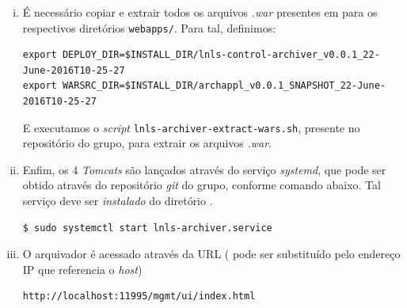 \begin {enumerate}[i.]
\begin{lstlisting}[keywordstyle=\ttfamily, style=nonumbers]
<Context ...>
	<Resource   name="jdbc/archappl"
	      auth="Container"
	      type="javax.sql.DataSource"
	      factory="org.apache.tomcat.jdbc.pool.DataSourceFactory"
	      username="lnls_user"
	      password="controle" 
	      testWhileIdle="true"
	      testOnBorrow="true"
	      testOnReturn="false"
	      validationQuery="SELECT 1"
	      validationInterval="30000"
	      timeBetweenEvictionRunsMillis="30000"
	      maxActive="10" 
	      minIdle="2" 
	      maxWait="10000" 
	      initialSize="2"
	      removeAbandonedTimeout="60"
	      removeAbandoned="true"
	      logAbandoned="true"
	      minEvictableIdleTimeMillis="30000" 
	      jmxEnabled="true"
	      driverClassName="com.mysql.jdbc.Driver"
	      url="jdbc:mysql://localhost:3306/lnls_appliance_database"
	 />
</Context>
\end{lstlisting}

Note que modificamos os campos \texttt{username}, \texttt{password} e
\texttt{url} de acordo com a instalação no item \ref{mysql-install}.

\item É necessário copiar e extrair todos os arquivos \textit{.war} presentes em
 para os respectivos
diretórios \texttt{webapps/}. Para tal, definimos:

\begin{lstlisting}[keywordstyle=\ttfamily, style=nonumbers]
export DEPLOY_DIR=$INSTALL_DIR/lnls-control-archiver_v0.0.1_22-June-2016T10-25-27
export WARSRC_DIR=$INSTALL_DIR/archappl_v0.0.1_SNAPSHOT_22-June-2016T10-25-27
\end{lstlisting}

E executamos o \textit{script} \texttt{lnls-archiver-extract-wars.sh}, presente
no repositório do grupo, para extrair os arquivos \textit{.war}.


\item Enfim, os 4 \textit{Tomcats} são lançados através do serviço
\textit{systemd}, que pode ser obtido através do repositório \textit{git} do
grupo, conforme comando abaixo. Tal serviço deve ser \textit{instalado} do
diretório .

\begin{lstlisting}[keywordstyle=\ttfamily, style=nonumbers]
$ sudo systemctl start lnls-archiver.service
\end{lstlisting}

\item O arquivador é acessado através da URL ( pode ser
substituído pelo endereço IP que referencia o \textit{host})

\begin{lstlisting}[keywordstyle=\ttfamily, style=nonumbers]
http://localhost:11995/mgmt/ui/index.html
\end{lstlisting}

\end{enumerate} 


